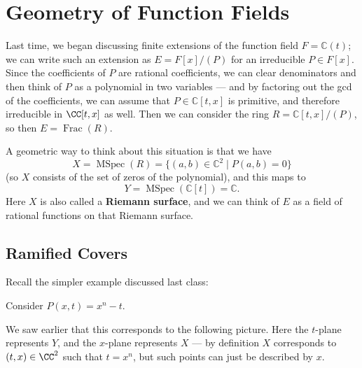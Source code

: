 

\section{Geometry of Function Fields}

Last time, we began discussing finite extensions of the function field $F = \mathbb{C}(t)$; we can write such an extension as $E = F[x]/(P)$ for an irreducible $P \in F[x]$. Since the coefficients of $P$ are rational coefficients, we can clear denominators and then think of $P$ as a polynomial in two variables --- and by factoring out the gcd of the coefficients, we can assume that $P \in \mathbb{C}[t, x]$ is primitive, and therefore irreducible in $\CC[t, x]$ as well. Then we can consider the ring $R = \mathbb{C}[t, x]/(P)$, so then $E = \operatorname{Frac}(R)$. 

A geometric way to think about this situation is that we have \[X = \operatorname{MSpec}(R) = \{(a, b) \in \mathbb{C}^2 \mid P(a, b) = 0\}\] (so $X$ consists of the set of zeros of the polynomial), and this maps to \[Y = \operatorname{MSpec}(\mathbb{C}[t]) = \mathbb{C}.\] Here $X$ is also called a \textbf{Riemann surface}, and we can think of $E$ as a field of rational functions on that Riemann surface. 

\subsection{Ramified Covers}

Recall the simpler example discussed last class:

\begin{example}
    Consider $P(x, t) = x^n - t$. 
\end{example}

We saw earlier that this corresponds to the following picture. Here the $t$-plane represents $Y$, and the $x$-plane represents $X$ --- by definition $X$ corresponds to $(t, x) \in \CC^2$ such that $t = x^n$, but such points can just be described by $x$. 

